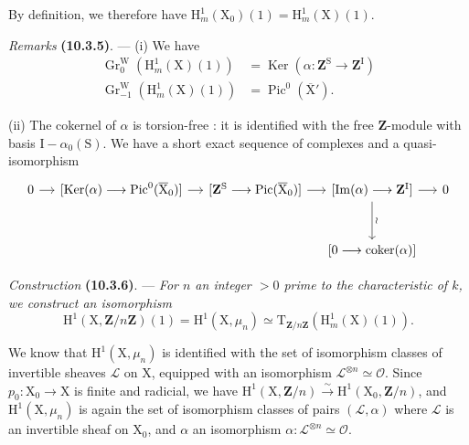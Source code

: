 \documentclass[11pt,leqno]{article}
\begin{document}
By definition, we therefore have \(\mathrm{H}^{1}_{m}(\mathrm{X}_0)(1)=\mathrm{H}^{1}_{m}(\mathrm{X})(1)\).

\textit{Remarks} \textbf{(10.3.5)}. — (i) We have
\[
\begin{aligned}
\operatorname{Gr}^{\mathrm{W}}_0(\mathrm{H}^{1}_{m}(\mathrm{X})(1))
  &=\operatorname{Ker}(\alpha:\mathbf{Z}^{\mathrm{S}}\to\mathbf{Z}^{\mathrm{I}})\\
\operatorname{Gr}^{\mathrm{W}}_{-1}(\mathrm{H}^{1}_{m}(\mathrm{X})(1))
  &=\operatorname{Pic}^{0}(\overline{\mathrm{X}}').
\end{aligned}
\]

(ii) The cokernel of \(\alpha\) is torsion-free : it is identified with the free \(\mathbf{Z}\)-module with basis \(\mathrm{I}-\alpha_0(\mathrm{S})\). We have a short exact sequence of complexes and a quasi-isomorphism
\[
\begin{tikzcd}[column sep=small,row sep=3em]
0 \arrow[r]
 & {[\operatorname{Ker}(\alpha)\longrightarrow
       \operatorname{Pic}^{0}(\overline{\mathrm{X}}_0)]} \arrow[r]
 & {[\mathbf{Z}^{\mathrm{S}}\longrightarrow
       \operatorname{Pic}(\overline{\mathrm{X}}_0)]} \arrow[r]
 & {[\operatorname{Im}(\alpha)\longrightarrow\mathbf{Z}^{\mathrm{I}}]}
       \arrow[r] \arrow[d,"\wr"]
 & 0 \\
 & & & {[0\longrightarrow\operatorname{coker}(\alpha)]} &
\end{tikzcd}
\]

\textit{Construction} \textbf{(10.3.6)}. — \textit{For \(n\) an integer \(>0\) prime to the characteristic of \(k\), we construct an isomorphism}
\[
\mathrm{H}^{1}(\mathrm{X},\mathbf{Z}/n\mathbf{Z})(1)
=\mathrm{H}^{1}(\mathrm{X},\mu_n)
\simeq
\mathrm{T}_{\mathbf{Z}/n\mathbf{Z}}(\mathrm{H}^{1}_{m}(\mathrm{X})(1)).
\]

We know that \(\mathrm{H}^{1}(\mathrm{X},\mu_n)\) is identified with the set of isomorphism classes of invertible sheaves \(\mathcal{L}\) on \(\mathrm{X}\), equipped with an isomorphism \(\mathcal{L}^{\otimes n}\simeq\mathcal{O}\). Since \(p_0:\mathrm{X}_0\to\mathrm{X}\) is finite and radicial, we have \(\mathrm{H}^{1}(\mathrm{X},\mathbf{Z}/n)\xrightarrow{\sim}\mathrm{H}^{1}(\mathrm{X}_0,\mathbf{Z}/n)\), and \(\mathrm{H}^{1}(\mathrm{X},\mu_n)\) is again the set of isomorphism classes of pairs \((\mathcal{L},\alpha)\) where \(\mathcal{L}\) is an invertible sheaf on \(\mathrm{X}_0\), and \(\alpha\) an isomorphism \(\alpha:\mathcal{L}^{\otimes n}\simeq\mathcal{O}\).
\end{document}
